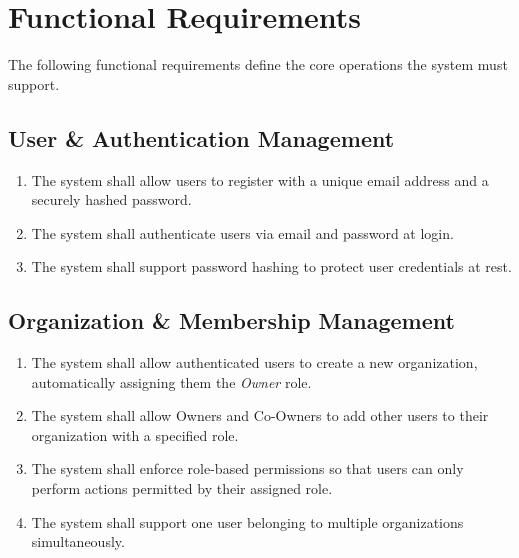 \documentclass[12pt,a4paper]{article}
\begin{document}
\section{Functional Requirements}


The following functional requirements define the core operations the system
must support.

\subsection{User \& Authentication Management}
\begin{enumerate}[label=FR-\arabic*., leftmargin=2cm]
    \item The system shall allow users to register with a unique email address
          and a securely hashed password.
    \item The system shall authenticate users via email and password at login.
    \item The system shall support password hashing to protect user credentials
          at rest.
\end{enumerate}

\subsection{Organization \& Membership Management}
\begin{enumerate}[label=FR-\arabic*., leftmargin=2cm, start=4]
    \item The system shall allow authenticated users to create a new
          organization, automatically assigning them the \emph{Owner} role.
    \item The system shall allow Owners and Co-Owners to add other users to
          their organization with a specified role.
    \item The system shall enforce role-based permissions so that users can
          only perform actions permitted by their assigned role.
    \item The system shall support one user belonging to multiple organizations
          simultaneously.
\end{enumerate}
\end{document}
